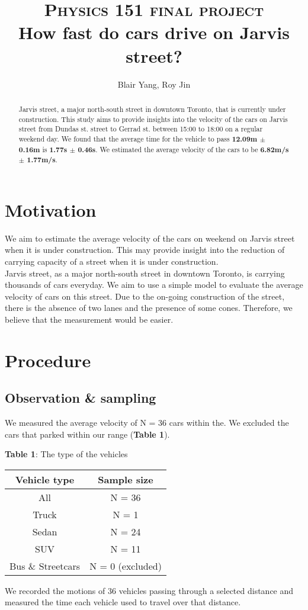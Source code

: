 \documentclass[10pt,twocolumn,letterpaper]{article}
\title{
		\usefont{OT1}{bch}{b}{n}
		\normalfont \normalsize \textsc{Physics 151 final project} \\ [10pt]
		\huge How fast do cars drive on Jarvis street? \\
}
\author{Blair Yang, Roy Jin}
\begin{document}
\maketitle
\begin{abstract}
Jarvis street, a major north-south street in downtown Toronto, that is currently under construction. This study aims to provide insights into the velocity of the cars on Jarvis street from Dundas st. street to Gerrad st. between 15:00 to 18:00 on a regular weekend day. We found that the average time for the vehicle to pass \textbf{12.09m $\pm$ 0.16m} is \textbf{1.77s $\pm$ 0.46s}. We estimated the average velocity of the cars to be \textbf{6.82m/s $\pm$ 1.77m/s}.
\end{abstract} 

\section{Motivation}
We aim to estimate the average velocity of the cars on weekend on Jarvis street when it is under construction. This may provide insight into the reduction of carrying capacity of a street when it is under construction.
\\Jarvis street, as a major north-south street in downtown Toronto, is carrying thousands of cars everyday. We aim to use a simple model to evaluate the average velocity of cars on this street. Due to the on-going construction of the street, there is the absence of two lanes and the presence of some cones. Therefore, we believe that the measurement would be easier.


\section{Procedure}
\subsection{Observation \& sampling}
We measured the average velocity of N = 36 cars within the. We excluded the cars that parked within our range (\textbf{Table 1}). 
\begin{center}
	\textbf{Table 1}: The type of the vehicles\\
    \begin{tabular}{cc}
    \toprule
    Vehicle type &Sample size\\
    \midrule
    All & N = 36\\
    Truck     & N = 1 \\
    Sedan     &  N = 24\\
    SUV & N = 11\\
    Bus \& Streetcars & N = 0 (excluded)\\
    \bottomrule
    \end{tabular}
\end{center}
We recorded the motions of 36 vehicles passing through a selected distance and measured the time each vehicle used to travel over that distance.
\end{document}
